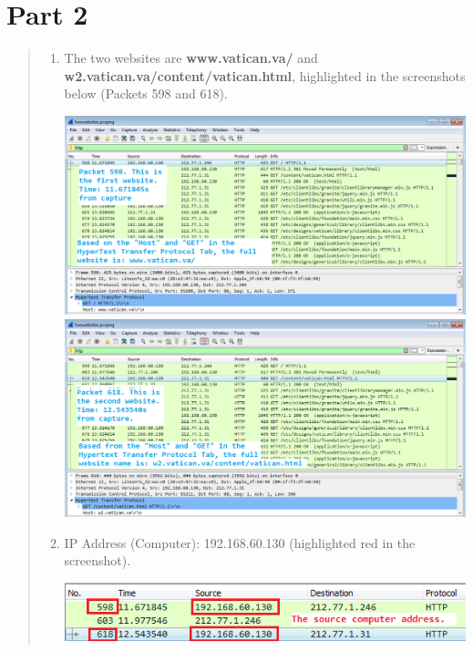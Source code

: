 \documentclass[11pt]{article}
\begin{document}
\section*{Part 2}
\begin{quote}
\begin{enumerate}
\item
The two websites are \textbf{www.vatican.va/} and \textbf{w2.vatican.va/content/vatican.html}, highlighted in the screenshots below (Packets 598 and 618).

\begin{center}
\includegraphics[scale=0.5]{LEPic_2A_1}
\includegraphics[scale=0.5]{LEPic_2A_2}
\end{center}

\item
IP Address (Computer): 192.168.60.130 (highlighted red in the screenshot).

\begin{center}
\includegraphics[scale=1]{LEPic_2B}
\end{center}
\end{enumerate}
\end{quote}
\end{document}
